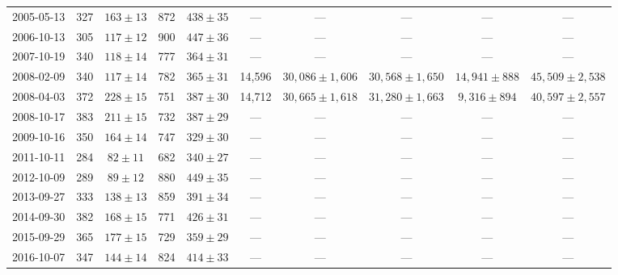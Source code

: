 \begin{landscape}
\begin{longtable}{cccccccccc}
{2005-05-13} & 327 & {$163  \pm  13$} & 872 & {$438 \pm 35$} & --- & --- & --- & --- & --- \\
{2006-10-13} & 305 & {$117  \pm  12$} & 900 & {$447 \pm 36$} & --- & --- & --- & --- & --- \\
{2007-10-19} & 340 & {$118  \pm  14$} & 777 & {$364 \pm 31$} & --- & --- & --- & --- & --- \\
{2008-02-09} & 340 & {$117  \pm  14$} & 782 & {$365 \pm 31$} & 14,596 & {$30,086 \pm 1,606$} & {$30,568 \pm 1,650$} & {$14,941 \pm 888$} & {$45,509 \pm 2,538$} \\
{2008-04-03} & 372 & {$228  \pm  15$} & 751 & {$387 \pm 30$} & 14,712 & {$30,665 \pm 1,618$} & {$31,280 \pm 1,663$} & {$9,316 \pm 894$} & {$40,597 \pm 2,557$} \\
{2008-10-17} & 383 & {$211  \pm  15$} & 732 & {$387 \pm 29$} & --- & --- & --- & --- & --- \\
{2009-10-16} & 350 & {$164  \pm  14$} & 747 & {$329 \pm 30$} & --- & --- & --- & --- & --- \\
{2011-10-11} & 284 & {$82  \pm  11$} & 682 & {$340 \pm 27$} & --- & --- & --- & --- & --- \\
{2012-10-09} & 289 & {$89  \pm  12$} & 880 & {$449 \pm 35$} & --- & --- & --- & --- & --- \\
{2013-09-27} & 333 & {$138  \pm  13$} & 859 & {$391 \pm 34$} & --- & --- & --- & --- & --- \\
{2014-09-30} & 382 & {$168  \pm  15$} & 771 & {$426 \pm 31$} & --- & --- & --- & --- & --- \\
{2015-09-29} & 365 & {$177  \pm  15$} & 729 & {$359 \pm 29$} & --- & --- & --- & --- & --- \\
{2016-10-07} & 347 & {$144  \pm  14$} & 824 & {$414 \pm 33$} & --- & --- & --- & --- & --- \\
\end{longtable} 
\end{landscape} 
